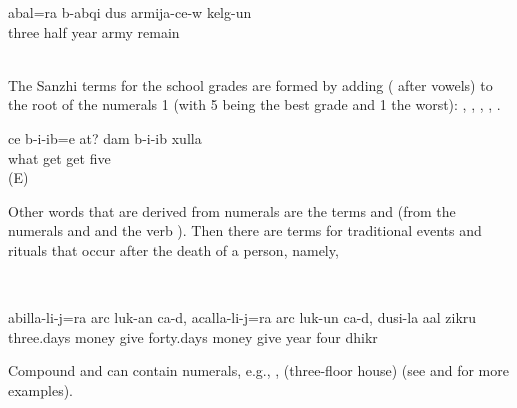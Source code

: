 \ex\label{ex:hespentthreeandahalfyears}
\gll	{\eppl}a{\pha}bal=ra	b-abq{\ej}i	dus	{\eppl}a{\pha}rmija-c{\lmk}e-w	kelg-un\\
	three	half	year	army	remain\\
\glt‎‎	
\z

The Sanzhi terms for the school grades are formed by adding  ( after vowels) to the root of the numerals 1 (with 5 being the best grade and 1 the worst):  ,  ,  ,  ,   . 

\ea\label{ex:whatgradedidyougetIgotafive}
\gll	ce	b-i{\paaf}-ib=e	at?	dam	b-i{\paaf}-ib	xulla\\
	what	get			get	five\\
\glt	{} (E)
\z

Other words that are derived from numerals are the terms   and   (from the numerals  and  and the verb  ). Then there are terms for traditional events and rituals that occur after the death of a person, namely, 
%

	\ea	\label{ex:daysafterdeath}
		\TabPositions{12em}
					 \tab {}		 \\
			 \tab 	{}				


\ex\label{ex:afterthreedayspeoplegivealms}
\gll	{\eppl}a{\pha}billa-li-j=ra	arc luk{\lmk}-an ca-d,	a{\vuvfr}{\lab}c{\ej}alla-li-j=ra	arc	luk{\lmk}-un ca-d,		dus{\lmk}i-la	a{\vuvfr}{\lab}al	zikru\\
	three.days	money give 	forty.days	money	give 	year	four	dhikr\\
\glt	{}
\z

Compound  and  can contain numerals, e.g.,   ,  (three-floor house)  (see  and  for more examples).

